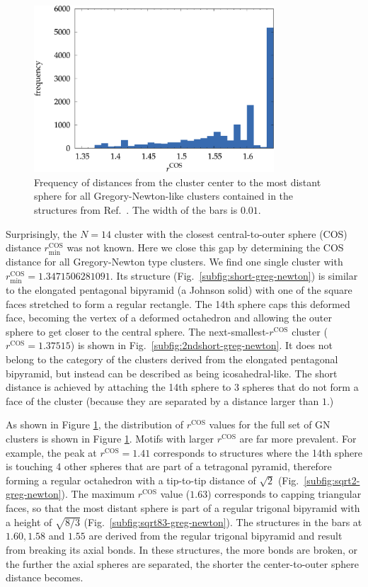 \begin{figure}
    \centering
    \includegraphics[width=0.8\textwidth]{gregory-newton/greg-newton.pdf}
    \caption{Frequency of distances from the cluster center to the most distant
    sphere for all Gregory-Newton-like clusters contained in the structures
    from Ref.~\cite{Holmes-Cerfon_EnumeratingRigidSphere_2016}. The width of the bars is $0.01$.}
    \label{fig:greg-newton}
\end{figure}


Surprisingly, the $N = 14$ cluster with the closest central-to-outer sphere
(COS) distance $r_\text{min}^\text{COS}$ was not known. Here we close this gap by
determining the COS distance for all Gregory-Newton type clusters.  We find one
single cluster with $r_\text{min}^\text{COS}=1.3471506281091$.  Its structure
(Fig.\ \ref{subfig:short-greg-newton}) is similar to the elongated pentagonal bipyramid (a
Johnson solid) with one of the square faces stretched to form a regular
rectangle.  The 14th sphere caps this deformed face, becoming the vertex of a
deformed octahedron and allowing the outer sphere to get closer to the central
sphere.  The next-smallest-$r^\text{COS}$ cluster ($r^\text{COS} = 1.37515$) is
shown in Fig.~\ref{subfig:2ndshort-greg-newton}.  It does not belong to the
category of the clusters derived from the elongated pentagonal bipyramid, but
instead can be described as being icosahedral-like.  The short distance is
achieved by attaching the 14th sphere to 3 spheres that do not form a face of
the cluster (because they are separated by a distance larger than $1$.)


As shown in Figure \ref{fig:greg-newton}, the distribution of $r^\text{COS}$
values for the full set of \ac{GN} clusters is shown in Figure
\ref{fig:greg-newton}.  Motifs with larger $r^\text{COS}$ are far more
prevalent.  For example, the peak at $r^\text{COS} = 1.41$ corresponds to
structures where the 14th sphere is touching 4 other spheres that are part of a
tetragonal pyramid, therefore forming a regular octahedron with a tip-to-tip
distance of $\sqrt{2}$ (Fig.~\ref{subfig:sqrt2-greg-newton}).  The maximum
$r^\text{COS}$ value ($1.63$) corresponds to capping triangular faces, so that
the most distant sphere is part of a regular trigonal bipyramid with a height
of $\sqrt{8/3}$ (Fig.~\ref{subfig:sqrt83-greg-newton}).  The structures in the
bars at $1.60,1.58$ and $1.55$ are derived from the regular trigonal bipyramid
and result from breaking its axial bonds.  In these structures, the more bonds
are broken, or the further the axial spheres are separated, the shorter the
center-to-outer sphere distance becomes.
